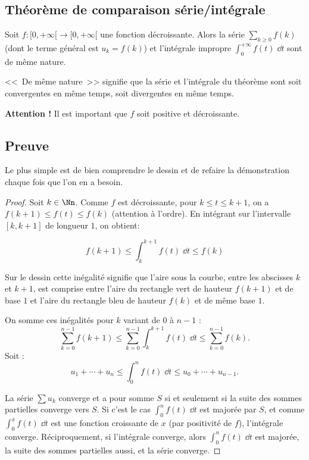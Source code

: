 \documentclass[class=report,crop=false]{standalone}
\begin{document}
\subsection{Théorème de comparaison série/intégrale}

\begin{theoreme}
\label{th:serieintegrale}
Soit $f : [0,+\infty[ \to [0,+\infty[$ une fonction décroissante.
Alors la série $\sum_{k \ge 0} f(k)$ (dont le terme général est $u_k = f(k)$) 
et l'intégrale impropre $\int_0^{+\infty} f(t) \; \dd t$ sont de même nature.
\end{theoreme}

<<~De même nature~>> signifie que la série et l'intégrale du théorème sont soit
convergentes en même temps, soit divergentes en même temps.

\textbf{Attention !} Il est important que $f$ soit positive et 
décroissante.

\subsection{Preuve}


Le plus simple est de bien comprendre le dessin et de refaire la démonstration
chaque fois que l'on en a besoin.


\begin{proof}
Soit $k\in\Nn$. Comme $f$ est décroissante, pour $k\le t \le k+1$, 
on a $f(k+1)\le f(t)\le f(k)$ (attention à l'ordre). En intégrant 
sur l'intervalle $[k,k+1]$ de longueur $1$, on obtient:

\begin{minipage}{0.39\textwidth}
$$f(k+1)\le \int_k^{k+1} f(t) \; \dd t \le f(k)$$  
\end{minipage}
\begin{minipage}{0.49\textwidth}
\end{minipage}

Sur le dessin cette inégalité signifie que l'aire sous la courbe, 
entre les abscisses $k$ et $k+1$, est comprise entre l'aire du rectangle
vert de hauteur $f(k+1)$ et de base $1$ et l'aire du rectangle bleu de hauteur
$f(k)$ et de même base $1$.



On somme ces inégalités pour $k$ variant de $0$ à $n-1$ :
$$\sum_{k=0}^{n-1} f(k+1) \le \sum_{k=0}^{n-1} \int_{k}^{k+1} f(t) \; \dd t
\le \sum_{k=0}^{n-1} f(k).$$
Soit :
$$u_1+\cdots+u_{n} \le \int_0^{n} f(t)\; \dd t \le u_0+\cdots+u_{n-1}.$$

La série $\sum u_k$ converge et a pour somme $S$ 
si et seulement si la suite des sommes
partielles converge vers $S$.  
Si c'est le cas $\int_0^{n} f(t)\; \dd t$ est
majorée par $S$, et comme $\int_0^x f(t)\; \dd t$ est une fonction croissante de $x$
(par positivité de $f$), l'intégrale converge. Réciproquement, si l'intégrale
converge, alors $\int_0^{n} f(t)\;\dd t$ est majorée, la suite des
sommes partielles aussi, et la série converge.
\end{proof}
\end{document}
